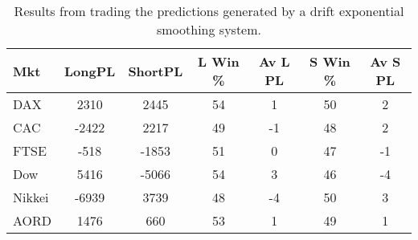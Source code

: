 \begin{table}[ht]
\centering
\caption[Results from trading the predictions generated by a drift exponential smoothing system]{Results from trading the predictions generated by a drift exponential smoothing system.} 
\label{tab:es_drift_sys}
\begin{tabular}{lcccccc}
  \toprule Mkt & LongPL & ShortPL & L Win \% & Av L PL & S Win \% & Av S PL \\ 
  \midrule DAX & 2310 & 2445 & 54 & 1 & 50 & 2 \\ 
  CAC & -2422 & 2217 & 49 & -1 & 48 & 2 \\ 
  FTSE & -518 & -1853 & 51 & 0 & 47 & -1 \\ 
  Dow & 5416 & -5066 & 54 & 3 & 46 & -4 \\ 
  Nikkei & -6939 & 3739 & 48 & -4 & 50 & 3 \\ 
  AORD & 1476 & 660 & 53 & 1 & 49 & 1 \\ 
   \bottomrule \end{tabular}
\end{table}
